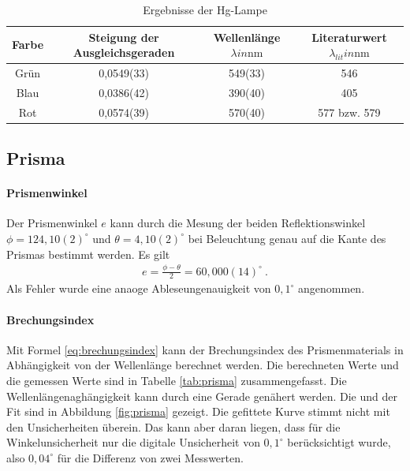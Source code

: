 \documentclass[11pt, a4paper]{article}
\begin{document}
    \begin{table}
        \centering
        \begin{tabular}{c|c|c|c}
            
            Farbe & Steigung der Ausgleichsgeraden & Wellenlänge $\lambda in \si{\nano\metre}$  & Literaturwert  $\lambda_{lit} in \si{\nano\metre}$\\ \hline
            Grün & 0,0549(33) & 549(33) & 546 \\ \hline
            Blau &  0,0386(42) & 390(40) & 405 \\ \hline
            Rot & 0,0574(39) & 570(40) &577 bzw. 579  \\\hline

        \end{tabular}
        \caption{Ergebnisse der Hg-Lampe}
        \label{tab:Gitter}
    \end{table}

    \subsection{Prisma}
    \paragraph{Prismenwinkel}
    Der Prismenwinkel $e$ kann durch die Mesung der beiden Reflektionswinkel $\phi = 124,10(2)^{\circ}$ und $\theta = 4,10(2)^{\circ}$ bei Beleuchtung genau auf die Kante des Prismas bestimmt werden. Es gilt
    \begin{align}
        e = \frac{\phi - \theta}{2} = 60,000(14)^{\circ} \label{eq:prisma} \ .
    \end{align}
    Als Fehler wurde eine anaoge Ableseungenauigkeit von $0,1^{\circ}$ angenommen.

    \paragraph{Brechungsindex}
    Mit Formel \ref{eq:brechungsindex} kann der Brechungsindex des Prismenmaterials in Abhängigkeit von der Wellenlänge berechnet werden. Die berechneten Werte und die gemessen Werte sind in Tabelle \ref{tab:prisma} zusammengefasst. Die Wellenlängenaghängigkeit kann durch eine Gerade genähert werden. Die und der Fit sind in Abbildung \ref{fig:prisma} gezeigt. Die gefittete Kurve stimmt nicht mit den Unsicherheiten überein. Das kann aber daran liegen, dass für die Winkelunsicherheit nur die digitale Unsicherheit von $0,1^{\circ}$ berücksichtigt wurde, also $0,04^{\circ}$ für die Differenz von zwei Messwerten.
\end{document}
